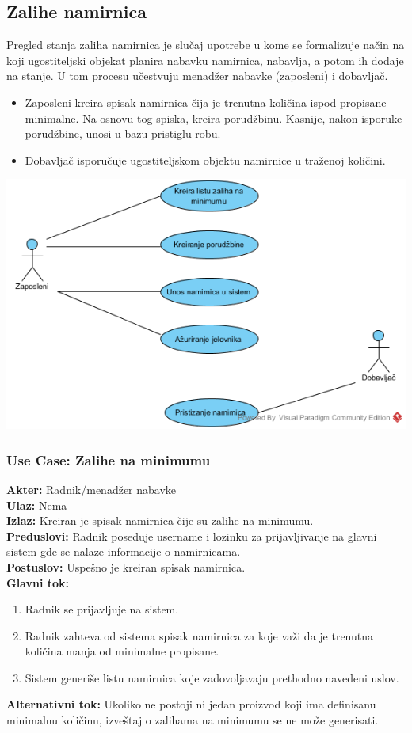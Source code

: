 \documentclass{article}
\begin{document}
\subsection{Zalihe namirnica}
Pregled stanja zaliha namirnica je slučaj upotrebe u kome se formalizuje način na koji ugostiteljski objekat planira nabavku namirnica, nabavlja, a potom ih dodaje na stanje. U tom procesu učestvuju menadžer nabavke (zaposleni) i dobavljač. 

\begin{itemize}
\item Zaposleni kreira spisak namirnica čija je trenutna količina ispod propisane minimalne. Na osnovu tog spiska, kreira porudžbinu. Kasnije, nakon isporuke porudžbine, unosi u bazu pristiglu robu.
\item Dobavljač isporučuje ugostiteljskom objektu namirnice u traženoj količini.
\end{itemize}
\includegraphics[width=\textwidth]{SU_1_zalihe.png}
\subsubsection{\textbf{Use Case}: Zalihe na minimumu}
\textbf{Akter:} Radnik/menadžer nabavke\\
\textbf{Ulaz:} Nema\\
\textbf{Izlaz:} Kreiran je spisak namirnica čije su zalihe na minimumu.\\
\textbf{Preduslovi:} Radnik poseduje username i lozinku za prijavljivanje na glavni sistem gde se nalaze informacije o namirnicama.\\
\textbf{Postuslov:} Uspešno je kreiran spisak namirnica.\\
\textbf{Glavni tok:} 
\begin{enumerate}
	\item Radnik se prijavljuje na sistem.
	\item Radnik zahteva od sistema spisak namirnica za koje važi da je trenutna količina manja od minimalne propisane.
	\item Sistem generiše listu namirnica koje zadovoljavaju prethodno navedeni uslov.
\end{enumerate}
\textbf{Alternativni tok:} Ukoliko ne postoji ni jedan proizvod koji ima definisanu minimalnu količinu, izveštaj o zalihama na minimumu se ne može generisati.\\
\end{document}
